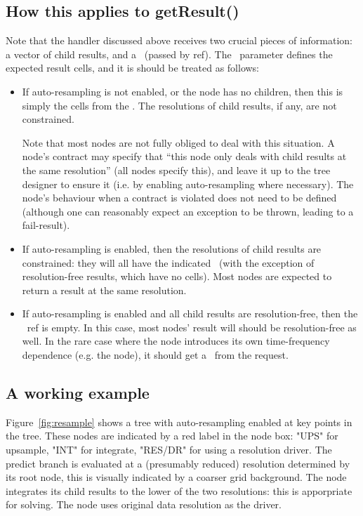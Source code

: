 \subsection{How this applies to getResult()}
  \label{sec:getResult}

  Note that the  handler discussed above receives two crucial
  pieces of information: a vector of child results, and a \Cells\ (passed by
  ref). The \Cells\ parameter defines the expected result cells, and it is
  should be treated as follows:

  \begin{itemize}
  
  \item If auto-resampling is not enabled, or the node has no children, then
  this is simply the cells from the \Request. The resolutions of child results,
  if any, are not constrained.
  
  Note that most nodes are not fully obliged to deal with this situation. A
  node's contract may specify that ``this node only deals with child results at
  the same resolution'' (all  nodes specify this), and leave it up
  to the tree designer to ensure it (i.e. by enabling auto-resampling where
  necessary). The node's behaviour when a contract is violated does not need to
  be defined (although one can reasonably expect an exception to be thrown,
  leading to a fail-result).

  \item If auto-resampling is enabled, then the resolutions of child results
  are constrained: they will all have the indicated \Cells\ (with the exception
  of resolution-free results, which have no cells). Most nodes are expected to
  return a result at the same resolution.

  \item If auto-resampling is enabled and all child results are
  resolution-free, then the \Cells\ ref is empty. In this case, most nodes'
  result will should be resolution-free as well. In the rare case where the
  node introduces its own time-frequency dependence (e.g. the  node),
  it should get a \Cells\ from the request.

  \end{itemize}

\subsection{A working example}

  Figure~\ref{fig:resample} shows a tree with auto-resampling enabled at key
  points in the tree. These nodes are indicated by a red label in the node box:
  "UPS" for upsample, "INT" for integrate, "RES/DR" for using a resolution
  driver. The predict branch is evaluated at a (presumably reduced) resolution
  determined by its root  node, this is visually indicated by a
  coarser grid background. The  node integrates its child results to
  the lower of the two resolutions: this is apporpriate for solving. The
   node uses original data resolution as the driver.
  
